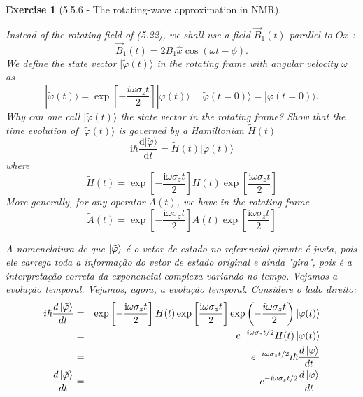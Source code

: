 \documentclass[12pt]{article}
\def\bea{\begin{eqnarray*}}
\def\eea{\end{eqnarray*}}
\def\f{\frac}
\def\l{\left}
\def\r{\right}
\newtheorem{exercise}{Exercise}
\begin{document}
	\begin{exercise}[5.5.6 - The rotating-wave approximation in NMR]
		\begin{exercises}
			\item Instead of the rotating field of (5.22), we shall use a field $\vec{B}_{1}(t)$ parallel to $O x$ :
			$$
			\vec{B}_{1}(t)=2 B_{1} \hat{x} \cos (\omega t-\phi) .
			$$
			We define the state vector $|\tilde{\varphi}(t)\rangle$ in the rotating frame with angular velocity $\omega$ as
			$$
			|\tilde{\varphi}(t)\rangle=\exp \left[-\frac{i \omega \sigma_{z} t}{2}\right]|\varphi(t)\rangle \quad|\tilde{\varphi}(t=0)\rangle=|\varphi(t=0)\rangle .
			$$
			Why can one call $|\tilde{\varphi}(t)\rangle$ the state vector in the rotating frame? Show that the time evolution of $|\tilde{\varphi}(t)\rangle$ is governed by a Hamiltonian $\tilde{H}(t)$
			$$
			\mathrm{i} \hbar \frac{\mathrm{d}|\tilde{\varphi}\rangle}{\mathrm{d} t}=\tilde{H}(t)|\tilde{\varphi}(t)\rangle
			$$
			where
			$$
			\tilde{H}(t)=\exp \left[-\frac{\mathrm{i} \omega \sigma_{z} t}{2}\right] H(t) \exp \left[\frac{\mathrm{i} \omega \sigma_{z} t}{2}\right]
			$$
			More generally, for any operator $A(t)$, we have in the rotating frame
			$$
			\tilde{A}(t)=\exp \left[-\frac{\mathrm{i} \omega \sigma_{z} t}{2}\right] A(t) \exp \left[\frac{\mathrm{i} \omega \sigma_{z} t}{2}\right]
			$$
			\begin{multianswer}
				A nomenclatura de que $\ket{\tilde{\varphi}}$ é o vetor de estado no referencial girante é justa, pois ele carrega toda a informação do vetor de estado original e ainda "gira", pois é a interpretação correta da exponencial complexa variando no tempo. Vejamos a evolução temporal. Vejamos, agora, a evolução temporal. Considere o lado direito:
				\bea
					i\hbar\f{d\ket{\tilde{\varphi}}}{dt} &=& \exp \left[-\frac{\mathrm{i} \omega \sigma_{z} t}{2}\right] H(t) \exp \left[\frac{\mathrm{i} \omega \sigma_{z} t}{2}\right] \exp\l( -\f{i\omega\sigma_z t}{2}\r) \ket{\varphi(t)} \\
					&=& e^{-i\omega\sigma_zt/2} H(t)\ket{\varphi(t)} \\
					&=& e^{-i\omega\sigma_zt/2} i\hbar \f{d\ket{\varphi}}{dt} \\
					\f{d\ket{\tilde{\varphi}}}{dt} &=& e^{-i\omega\sigma_zt/2} \f{d\ket{\varphi}}{dt}
				\eea	
			\end{multianswer}			
			

\end{exercises}
\end{exercise}
\end{document}
